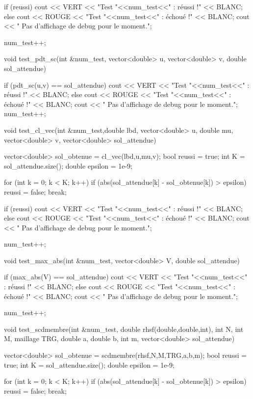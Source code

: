 \begin{codeblock}
{    if (reussi){
        cout << VERT << "Test "<<num_test<<" : réussi !\n" << BLANC;
    } else {
        cout << ROUGE << "Test "<<num_test<<" : échoué !\n" << BLANC;
        cout << "   Pas d'affichage de debug pour le moment.\n";
    }

    num_test++;
}


void test_pdt_sc(int &num_test, vector<double> u, vector<double> v,
        double sol_attendue){

    if (pdt_sc(u,v) == sol_attendue){
        cout << VERT << "Test "<<num_test<<" : réussi !\n" << BLANC;
    } else {
        cout << ROUGE << "Test "<<num_test<<" : échoué !\n" << BLANC;
        cout << "   Pas d'affichage de debug pour le moment.\n";
    }
    num_test++;
}


void test_cl_vec(int &num_test,double lbd, vector<double> u, double mu,
    vector<double> v, vector<double> sol_attendue){

    vector<double> sol_obtenue = cl_vec(lbd,u,mu,v);
    bool reussi = true;
    int K = sol_attendue.size();
    double epsilon = 1e-9;

    for (int k = 0; k < K; k++){
        if (abs(sol_attendue[k] - sol_obtenue[k]) > epsilon){
            reussi = false;
            break;
        }
    }

    if (reussi){
        cout << VERT << "Test "<<num_test<<" : réussi !\n" << BLANC;
    } else {
        cout << ROUGE << "Test "<<num_test<<" : échoué !\n" << BLANC;
        cout << "   Pas d'affichage de debug pour le moment.\n";
    }

    num_test++;
}


void test_max_abs(int &num_test, vector<double> V, double sol_attendue){

    if (max_abs(V) == sol_attendue){
        cout << VERT << "Test "<<num_test<<" : réussi !\n" << BLANC;
    } else {
        cout << ROUGE << "Test "<<num_test<<" : échoué !\n" << BLANC;
        cout << "   Pas d'affichage de debug pour le moment.\n";
    }

    num_test++;
}


void test_scdmembre(int &num_test, double rhsf(double,double,int), int N, int M, maillage TRG, double a, double b, int m, vector<double> sol_attendue){


    vector<double> sol_obtenue = scdmembre(rhsf,N,M,TRG,a,b,m);
    bool reussi = true;
    int K = sol_attendue.size();
    double epsilon = 1e-9;

    for (int k = 0; k < K; k++){
        if (abs(sol_attendue[k] - sol_obtenue[k]) > epsilon){
            reussi = false;
            break;
        }
    }

}
\end{codeblock}
